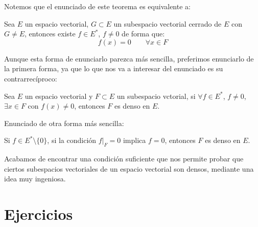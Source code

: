 \begin{observacion}
    Notemos que el enunciado de este teorema es equivalente a:
    \begin{center}
        Sea $E$ un espacio vectorial, $G\subset E$ un subespacio vectorial cerrado de $E$ con $G\neq E$, entonces existe $f\in E^\ast$, $f\neq 0$ de forma que:
        \begin{equation*}
            f(x) = 0 \qquad \forall x\in F
        \end{equation*}
    \end{center}
    Aunque esta forma de enunciarlo parezca más sencilla, preferimos enunciarlo de la primera forma, ya que lo que nos va a interesar del enunciado es su contrarrecíproco:
    \begin{center}
        Sea $E$ un espacio vectorial y $F\subset E$ un subespacio vctorial, si $\forall f\in E^\ast$, $f\neq 0$, $\exists x\in F$ con $f(x)\neq 0$, entonces $F$ es denso en $E$.
    \end{center}
    Enunciado de otra forma más sencilla:
    \begin{center}
        Si $f\in E^\ast\setminus\{0\}$, si la condición $f\big|_F=0$ implica $f=0$, entonces $F$ es denso en $E$.
    \end{center}
    Acabamos de encontrar una condición suficiente que nos permite probar que ciertos subespacios vectoriales de un espacio vectorial son densos, mediante una idea muy ingeniosa.
\end{observacion}

\section{Ejercicios}

